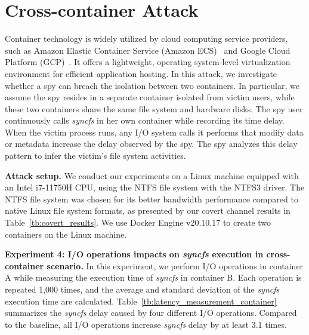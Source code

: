 
\section{Cross-container Attack}
Container technology is widely utilized by cloud computing service providers, such as Amazon Elastic Container Service (Amazon ECS)~\cite{AWS_docker} and Google Cloud Platform (GCP)~\cite{gcp_docker}. It offers a lightweight, operating system-level virtualization environment for efficient application hosting. In this attack, we investigate whether a spy can breach the isolation between two containers. In particular, we assume the spy resides in a separate container isolated from victim users, while these two containers share the same file system and hardware disks. The spy user continuously calls \textit{syncfs} in her own container while recording its time delay. When the victim process runs, any I/O system calls it performs that modify data or metadata increase the delay observed by the spy. The spy analyzes this delay pattern to infer the victim's file system activities. 

\textbf{Attack setup.} We conduct our experiments on a Linux machine equipped with an Intel i7-11750H CPU, using the NTFS file system with the NTFS3 driver. The NTFS file system was chosen for its better bandwidth performance compared to native Linux file system formats, as presented by our covert channel results in Table~\ref{tb:covert_results}. We use Docker Engine v20.10.17 to create two containers on the Linux machine.

\textbf{Experiment 4: I/O operations impacts on \textit{syncfs} execution in cross-container scenario.} In this experiment, we perform I/O operations in container A while measuring the execution time of \textit{syncfs} in container B. Each operation is repeated 1,000 times, and the average and standard deviation of the \textit{syncfs} execution time are calculated. Table~\ref{tb:latency_measurement_container} summarizes the \textit{syncfs} delay caused by four different I/O operations. Compared to the baseline, all I/O operations increase \textit{syncfs} delay by at least 3.1 times.

